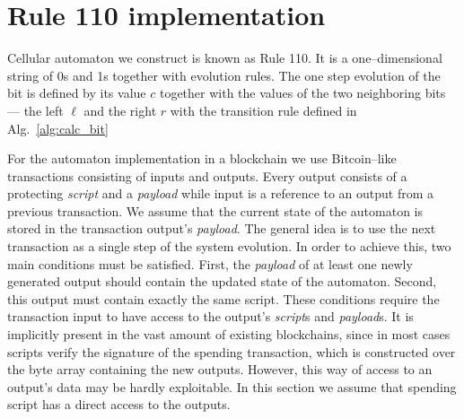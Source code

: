 \documentclass[runningheads]{llncs}
\newcommand{\payload}{\textit{payload}}
\newcommand{\script}{\textit{script}}
\begin{document}
    \section{Rule 110 implementation}
    \label{section2}
    Cellular automaton we construct is known as Rule 110.
    It is a one--dimensional string of 0s and 1s together with evolution rules.
    The one step evolution of the bit is defined by its value $c$ together with the
    values of the two neighboring bits --- the left $\ell$ and the right $r$ with the
    transition rule defined in Alg.~\ref{alg:calc_bit}
    

    For the automaton implementation in a blockchain we use
    Bitcoin--like transactions consisting of inputs and outputs. Every output
    consists of a protecting \script{} and a \payload{} while input is a
    reference to an output from a previous transaction.  We assume that the
    current state of the automaton is stored in the transaction output's
    \payload{}.  The general idea is to use the next transaction as a single
    step of the system evolution. In order to achieve this, two main conditions
    must be satisfied. First, the \payload{} of at least one newly generated
    output should contain the updated state of the automaton. Second, this
    output must contain exactly the same script. These conditions require the
    transaction input to have access to the output's \script{}s and \payload{}s.
    It is implicitly present in the vast amount of existing blockchains, since
    in most cases scripts verify the signature of the spending transaction,
    which is constructed over the byte array containing the new outputs.
    However, this way of access to an output's data may be hardly exploitable.
    In this section we assume that spending script has a direct access to the
    outputs.
\end{document}
